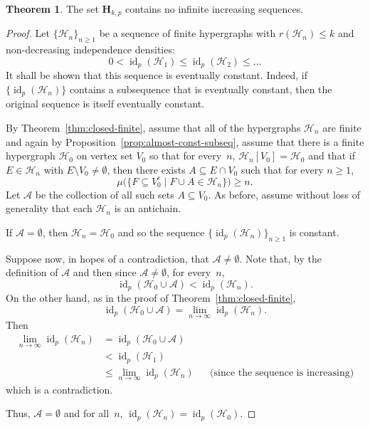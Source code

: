 \documentclass[11pt,reqno]{amsart}
\theoremstyle{definition}
\newtheorem{theorem}{Theorem}
\begin{document}
\begin{theorem}\label{thm:no-inc-seq}
The set $\mathbf{H}_{k,p}$ contains no infinite increasing sequences.
\end{theorem}
\begin{proof}
Let $\{\mathcal{H}_n\}_{n \geq 1}$ be a sequence of finite hypergraphs with $r(\mathcal{H}_n) \leq k$ and non-decreasing independence densities:
\[
 0 < {\operatorname{id}}_p(\mathcal{H}_1) \leq {\operatorname{id}}_p(\mathcal{H}_2) \leq \dots
\]
It shall be shown that this sequence is eventually constant.  Indeed, if $\{{\operatorname{id}}_p(\mathcal{H}_n)\}$ contains a subsequence that is eventually constant, then the original sequence is itself eventually constant.

By Theorem~\ref{thm:closed-finite}, assume that all of the hypergraphs $\mathcal{H}_n$ are finite and again by Proposition~\ref{prop:almost-const-subseq}, assume that there is a finite hypergraph $\mathcal{H}_0$ on vertex set $V_0$ so that for every~$n$, $\mathcal{H}_n[V_0] = \mathcal{H}_0$ and that if $E \in \mathcal{H}_n$ with $E \setminus V_0 \neq \emptyset$, then there exists $A \subseteq E \cap V_0$ such that for every $n \geq 1$,
\[
 \mu\big(\{F \subseteq V_0^c \mid F \cup A \in \mathcal{H}_n \}\big) \geq n.
\]
Let $\mathcal{A}$ be the collection of all such sets $A \subseteq V_0$. As before, assume without loss of generality that each $\mathcal{H}_n$ is an antichain.

If $\mathcal{A} = \emptyset$, then $\mathcal{H}_n = \mathcal{H}_0$ and so the sequence $\{{\operatorname{id}}_p(\mathcal{H}_n)\}_{n \geq 1}$ is constant.

Suppose now, in hopes of a contradiction, that $\mathcal{A} \neq \emptyset$. Note that, by the definition of $\mathcal{A}$ and then since $\mathcal{A} \neq \emptyset$, for every~$n$,
\[
 {\operatorname{id}}_p(\mathcal{H}_0 \cup \mathcal{A}) < {\operatorname{id}}_p(\mathcal{H}_n).
\]
On the other hand, as in the proof of Theorem~\ref{thm:closed-finite},
\[
 {\operatorname{id}}_p(\mathcal{H}_0 \cup \mathcal{A}) = \lim_{n \to \infty} {\operatorname{id}}_p(\mathcal{H}_n).
\]
Then
\begin{align*}
\lim_{n \to \infty} {\operatorname{id}}_p(\mathcal{H}_n)
	& = {\operatorname{id}}_p(\mathcal{H}_0 \cup \mathcal{A})\\
	& < {\operatorname{id}}_p(\mathcal{H}_1)\\
	& \leq \lim_{n \to \infty} {\operatorname{id}}_p(\mathcal{H}_n)	&&\text{(since the sequence is increasing)}
\end{align*}
which is a contradiction.

Thus, $\mathcal{A} = \emptyset$ and for all~$n$, ${\operatorname{id}}_p(\mathcal{H}_n) = {\operatorname{id}}_p(\mathcal{H}_0)$.
\end{proof}
\end{document}
